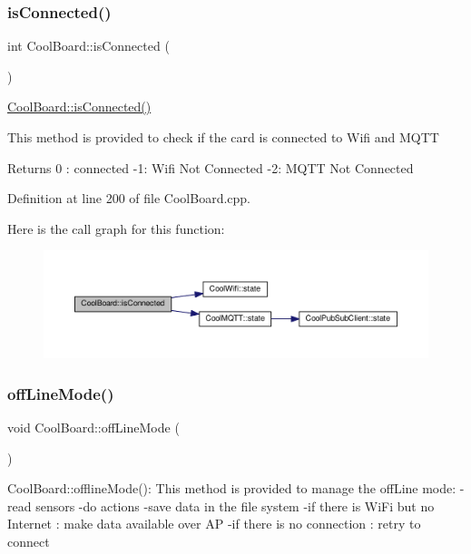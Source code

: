 \subsubsection{\texorpdfstring{is\+Connected()}{isConnected()}}
{\footnotesize\ttfamily int Cool\+Board\+::is\+Connected (\begin{DoxyParamCaption}{ }\end{DoxyParamCaption})}

\hyperlink{class_cool_board_ad7442cf4b62c7b0d5bd62a0f75ffc065}{Cool\+Board\+::is\+Connected()}

This method is provided to check if the card is connected to Wifi and M\+Q\+TT

\begin{DoxyReturn}{Returns}
0 \+: connected -\/1\+: Wifi Not Connected -\/2\+: M\+Q\+TT Not Connected 
\end{DoxyReturn}


Definition at line 200 of file Cool\+Board.\+cpp.

Here is the call graph for this function\+:
\nopagebreak
\begin{figure}[H]
\begin{center}
\leavevmode
\includegraphics[width=350pt]{class_cool_board_ad7442cf4b62c7b0d5bd62a0f75ffc065_cgraph}
\end{center}
\end{figure}
\mbox{\label{class_cool_board_ae6b5e1274d760462290192acea4adca8}} 
\subsubsection{\texorpdfstring{off\+Line\+Mode()}{offLineMode()}}
{\footnotesize\ttfamily void Cool\+Board\+::off\+Line\+Mode (\begin{DoxyParamCaption}{ }\end{DoxyParamCaption})}

Cool\+Board\+::offline\+Mode()\+: This method is provided to manage the off\+Line mode\+: -\/read sensors -\/do actions -\/save data in the file system -\/if there is Wi\+Fi but no Internet \+: make data available over AP -\/if there is no connection \+: retry to connect 

